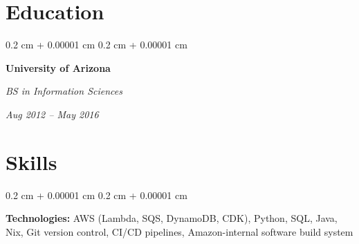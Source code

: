 \documentclass[10pt, letterpaper]{article}
\newenvironment{onecolentry}{
    \begin{adjustwidth}{
        0.2 cm + 0.00001 cm
    }{
        0.2 cm + 0.00001 cm
    }
}{
    \end{adjustwidth}
} %
\newenvironment{twocolentry}[2][]{
    \onecolentry
    \def\secondColumn{#2}
    \setcolumnwidth{\fill, 4.5 cm}
    \begin{paracol}{2}
}{
    \switchcolumn \raggedleft \secondColumn
    \end{paracol}
    \endonecolentry
} %
\begin{document}
    
    \section{Education}



        
        \begin{twocolentry}{
            
            
        \textit{Aug 2012 – May 2016}}
            \textbf{University of Arizona}

            \textit{BS in Information Sciences}
        \end{twocolentry}




    
    \section{Skills}



        
        \begin{onecolentry}
            \textbf{Technologies:} AWS (Lambda, SQS, DynamoDB, CDK), Python, SQL, Java, Nix, Git version control, CI/CD pipelines, Amazon-internal software build system
        \end{onecolentry}


    
\end{document}
